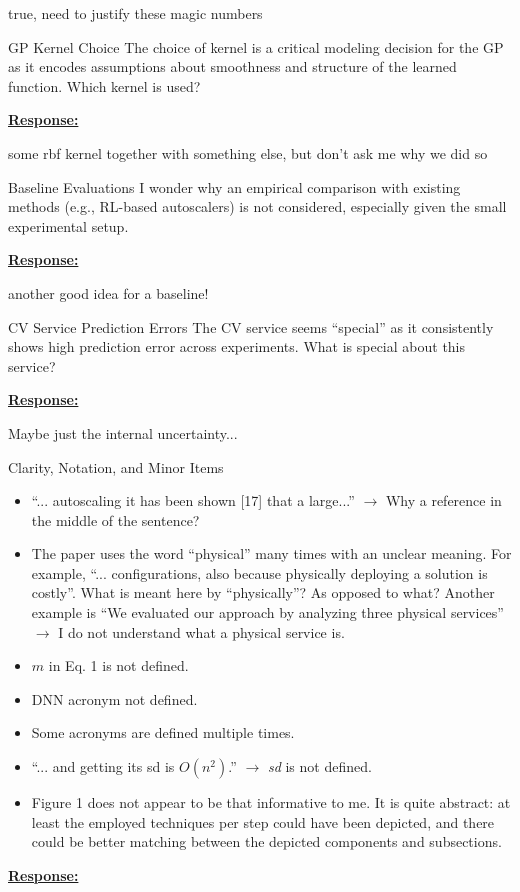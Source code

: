\documentclass{article}
\newcommand{\Response}[1][]{%
    \noindent\underline{\textbf{Response:}}\par\vspace{0.2cm}%
    #1\par\vspace{0.6cm}%
}
\begin{document}
true, need to justify these magic numbers

\begin{cmt}{GP Kernel Choice}{}
The choice of kernel is a critical modeling decision for the GP as it encodes assumptions about smoothness and structure of the learned function. Which kernel is used?
\end{cmt}
\Response

some rbf kernel together with something else, but don't ask me why we did so

\begin{cmt}{Baseline Evaluations}{}
I wonder why an empirical comparison with existing methods (e.g., RL-based autoscalers) is not considered, especially given the small experimental setup.
\end{cmt}
\Response

another good idea for a baseline!

\begin{cmt}{CV Service Prediction Errors}{}
The CV service seems ``special'' as it consistently shows high prediction error across experiments. What is special about this service?
\end{cmt}
\Response

Maybe just the internal uncertainty...

\begin{cmt}{Clarity, Notation, and Minor Items}{}
\begin{itemize}[noitemsep,topsep=0pt]
    \item ``... autoscaling it has been shown [17] that a large...'' $\rightarrow$ Why a reference in the middle of the sentence?
    \item The paper uses the word ``physical'' many times with an unclear meaning. For example, ``... configurations, also because physically deploying a solution is costly''. What is meant here by ``physically''? As opposed to what? Another example is ``We evaluated our approach by analyzing three physical services'' $\rightarrow$ I do not understand what a physical service is.
    \item $m$ in Eq. 1 is not defined.
    \item DNN acronym not defined.
    \item Some acronyms are defined multiple times.
    \item ``... and getting its sd is $O(n^2)$.'' $\rightarrow$ \textit{sd} is not defined.
    \item Figure 1 does not appear to be that informative to me. It is quite abstract: at least the employed techniques per step could have been depicted, and there could be better matching between the depicted components and subsections.
\end{itemize}
\end{cmt}
\Response
\end{document}
